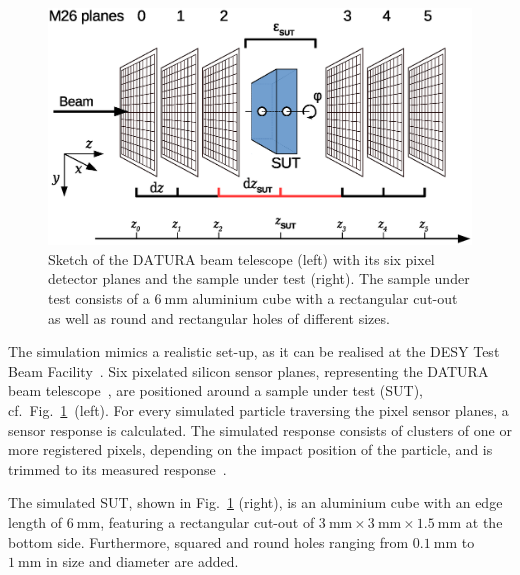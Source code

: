 \documentclass{PoS}
\newcommand{\Datura}{\ensuremath{\textrm{DATURA}}}
\begin{document}
\begin{figure}[!bp]
	\center
	\includegraphics[trim= 50 180 220 20, width=.55\linewidth]{figures/sketch_tscope.eps}
	\hspace{30pt}
	\caption[Sketch of the Datura beam telescope]{%
	Sketch of the $\Datura$ beam telescope (left) with its six pixel detector planes and the sample under test (right). 
	The sample under test consists of a $\SI{6}{\mm}$ aluminium cube with a rectangular cut-out as well as round and rectangular holes of different sizes.
	}
	\label{fig:setup}
\end{figure}

The simulation mimics a realistic set-up, as it can be realised at the DESY Test Beam Facility~\cite{ref:DESYtb}. 
Six pixelated  silicon sensor planes, representing the DATURA beam telescope~\cite{JansenEPJ}, are positioned around a sample under test (SUT), cf.\ Fig.~\ref{fig:setup}~(left). 
For every simulated particle traversing the pixel sensor planes, a sensor response is calculated. 
The simulated response consists of clusters of one or more registered pixels,
 depending on the impact position of the particle, and is trimmed to its measured response~\cite{ref:datura-inpixel}.

The simulated SUT, shown in Fig.~\ref{fig:setup} (right), is an aluminium cube with an edge length of $\SI{6}{\mm}$,
 featuring a rectangular cut-out of $\SI{3}{\mm}\times\SI{3}{\mm}\times\SI{1.5}{\mm}$ at the bottom side. 
Furthermore, squared and round holes ranging from $\SI{0.1}{\mm}$ to $\SI{1}{\mm}$ in size and diameter are added.%
\end{document}
